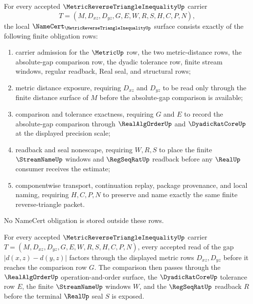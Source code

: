 \begin{theorem}
\label{thm:metric-reverse-triangle-inequality-namecert-obligations}
For every accepted $\MetricReverseTriangleInequalityUp$ carrier
$$
T=(M,D_{xz},D_{yz},G,E,W,R,S,H,C,P,N),
$$
the local $\NameCert_{\MetricReverseTriangleInequalityUp}$ surface consists exactly of the following finite obligation rows:
\begin{enumerate}
\item carrier admission for the $\MetricUp$ row, the two metric-distance rows, the absolute-gap comparison row, the dyadic tolerance row, finite stream windows, regular readback, Real seal, and structural rows;
\item metric distance exposure, requiring $D_{xz}$ and $D_{yz}$ to be read only through the finite distance surface of $M$ before the absolute-gap comparison is available;
\item comparison and tolerance exactness, requiring $G$ and $E$ to record the absolute-gap comparison through $\RealAlgOrderUp$ and $\DyadicRatCoreUp$ at the displayed precision scale;
\item readback and seal nonescape, requiring $W,R,S$ to place the finite $\StreamNameUp$ windows and $\RegSeqRatUp$ readback before any $\RealUp$ consumer receives the estimate;
\item componentwise transport, continuation replay, package provenance, and local naming, requiring $H,C,P,N$ to preserve and name exactly the same finite reverse-triangle packet.
\end{enumerate}
No NameCert obligation is stored outside these rows.
\end{theorem}

\begin{theorem}
\label{thm:metric-reverse-triangle-inequality-distance-gap}
For every accepted $\MetricReverseTriangleInequalityUp$ carrier $T=(M,D_{xz},D_{yz},G,E,W,R,S,H,C,P,N)$, every accepted read of the gap $|d(x,z)-d(y,z)|$ factors through the displayed metric rows $D_{xz},D_{yz}$ before it reaches the comparison row $G$. The comparison then passes through the $\RealAlgOrderUp$ operation-and-order surface, the $\DyadicRatCoreUp$ tolerance row $E$, the finite $\StreamNameUp$ windows $W$, and the $\RegSeqRatUp$ readback $R$ before the terminal $\RealUp$ seal $S$ is exposed.
\end{theorem}

